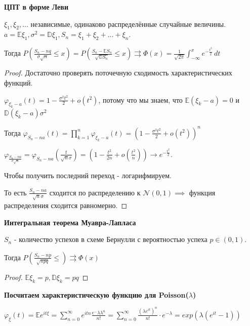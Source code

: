 
\begin{theorem}
    \textbf{ЦПТ в форме Леви}

    $\xi_1, \xi_2, \ldots $ независимые, одинаково распределённые случайные величины. $a = \mathbb{E} \xi_1,
    \sigma^2 = \mathbb{D} \xi_1, S_n = \xi_1 + \xi_2 + \ldots + \xi_n$.

    Тогда $P \left ( \frac{S_n - nq}{\sigma \sqrt{n}} \leqslant x \right ) = P\left ( \frac{S_n - \mathbb{E} S_n}{\sqrt{\mathbb{D} S_n}} \leqslant x \right ) \rightrightarrows \Phi (x) = \frac{1}{\sqrt{2\pi}} \int_{-\infty}^x e^{-\frac{t^2}{2}} \, dt$
\end{theorem}

\begin{proof}
    Достаточно проверять поточечную сходимость характеристических функций.

    $\varphi_{\xi_k - a} (t) = 1 - \frac{\sigma^2 t^2}{2} + o(t^2)$, потому что
    мы знаем, что $\mathbb{E} (\xi_k - a) = 0$ и $\mathbb{D} (\xi_k - a) \sigma^2$

    Тогда $\varphi_{S_n - na} (t) = \prod\limits_{k = 1}^n \varphi_{\xi_k - a} (t) = \left ( 1 - \frac{\sigma^2t^2}{2} + o(t^2) \right )^n$

    $\varphi_{\frac{S_n - na}{\sigma \sqrt{n}}} = \varphi_{S_n - na} \left ( \frac{t}{\sqrt{n}\sigma} \right ) = \left( 1 - \frac{t^2}{2n} + o(\frac{t^2}{n}) \right) \rightarrow e^{-\frac{t^2}{2}}$.

    Чтобы получить последний переход - логарифмируем.

    То есть $\frac{S_n - na}{\sqrt{n} \sigma}$ сходится по распределению к $\mathcal{N} (0, 1) \implies$ функция распределения сходится равномерно.
\end{proof}

\begin{consequence}
    \textbf{Интегральная теорема Муавра-Лапласа}

    $S_n$ - количество успехов в схеме Бернулли с вероятностью успеха $p \in (0, 1)$.

    Тогда $P \left( \frac{S_n - np}{\sqrt{npq}} \leqslant \right) \rightrightarrows \Phi (x)$
\end{consequence}

\begin{proof}
    $\mathbb{E} \xi_k = p, \mathbb{D} \xi_k = pq$
\end{proof}

\begin{example}
    \textbf{Посчитаем характеристическую функцию для Poisson($\lambda$)}

    $\varphi_{\xi} (t) = \mathbb{E} e^{i t \xi} = \sum_{n = 0}^\infty e^{itn} \frac{e^-\lambda \lambda^n}{n!} = \sum_{n = 0}^\infty \frac{(\lambda e^{it})^n}{n!} \cdot e^{-\lambda} = exp (\lambda (e^{it} - 1))$
\end{example}

